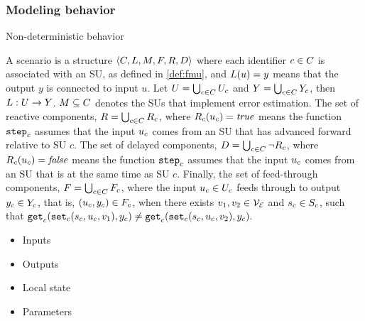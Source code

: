 \subsubsection{Modeling behavior}

Non-deterministic behavior


\begin{definition}[Scenario]\label{def:cosim_scenario}
  A scenario is a structure $ \left\langle C, L, M, F, R, D \right\rangle $ where each identifier $c \in C$ is associated with an SU, as defined in \cref{def:fmu}, and $L(u)=y$ means that the output $y$ is connected to input $u$.
  Let $U = \bigcup_{c \in C} U_{c}$ and $Y = \bigcup_{c \in C} Y_{c}$, then $L : U \to Y$. 
  $M \subseteq C$ denotes the SUs that implement error estimation. 
  The set of reactive components,
  $R = \bigcup_{c \in C} R_{c}$, where $R_{c}(u_{c}) = \mathit{true}$ means the function $\mathtt{step}_{c}$ assumes that the input $u_{c}$ comes from an SU that has advanced forward relative to SU $c$.  
The set of delayed components,
  $D = \bigcup_{c \in C} \neg R_{c}$, where $R_{c}(u_{c}) = \mathit{false}$ means the function $\mathtt{step}_{c}$ assumes that the input $u_{c}$ comes from an SU that is at the same time as SU $c$. 
 Finally, the set of feed-through components, $F = \bigcup_{c \in C} F_{c}$, where the input $u_{c} \in U_{c}$ feeds through to output $y_{c} \in Y_{c}$, that is, $(u_{c},y_{c}) \in F_{c}$, when there exists $v_1, v_2 \in \mathcal{V_{E}}$ and $s_{c} \in S_{c}$, such that
  $\mathtt{get}_{c} (\mathtt{set}_{c}(s_{c}, u_{c}, v_1), y_{c}) \neq \mathtt{get}_{c} (\mathtt{set}_{c}(s_{c}, u_{c}, v_2), y_{c}).$
\end{definition}  




\begin{itemize}
  \item Inputs
  \item Outputs
  \item Local state
  \item Parameters
\end{itemize}

